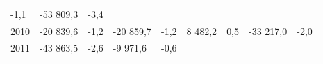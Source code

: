 \begin{longtable}[]{@{}lllllllll@{}}
\begin{minipage}[t]{0.06\columnwidth}
-1,1\strut
\end{minipage} & \begin{minipage}[t]{0.09\columnwidth}\raggedright
-53 809,3\strut
\end{minipage} & \begin{minipage}[t]{0.06\columnwidth}\raggedright
-3,4\strut
\end{minipage}\tabularnewline
\begin{minipage}[t]{0.05\columnwidth}\raggedright
2010\strut
\end{minipage} & \begin{minipage}[t]{0.10\columnwidth}\raggedright
-20 839,6\strut
\end{minipage} & \begin{minipage}[t]{0.06\columnwidth}\raggedright
-1,2\strut
\end{minipage} & \begin{minipage}[t]{0.16\columnwidth}\raggedright
-20 859,7\strut
\end{minipage} & \begin{minipage}[t]{0.06\columnwidth}\raggedright
-1,2\strut
\end{minipage} & \begin{minipage}[t]{0.12\columnwidth}\raggedright
8 482,2\strut
\end{minipage} & \begin{minipage}[t]{0.06\columnwidth}\raggedright
0,5\strut
\end{minipage} & \begin{minipage}[t]{0.09\columnwidth}\raggedright
-33 217,0\strut
\end{minipage} & \begin{minipage}[t]{0.06\columnwidth}\raggedright
-2,0\strut
\end{minipage}\tabularnewline
\begin{minipage}[t]{0.05\columnwidth}\raggedright
2011\strut
\end{minipage} & \begin{minipage}[t]{0.10\columnwidth}\raggedright
-43 863,5\strut
\end{minipage} & \begin{minipage}[t]{0.06\columnwidth}\raggedright
-2,6\strut
\end{minipage} & \begin{minipage}[t]{0.16\columnwidth}\raggedright
-9 971,6\strut
\end{minipage} & \begin{minipage}[t]{0.06\columnwidth}\raggedright
-0,6\strut
\end{minipage} & \begin{minipage}[t]{0.12\columnwidth}\raggedright

\end{minipage}
\end{longtable}
